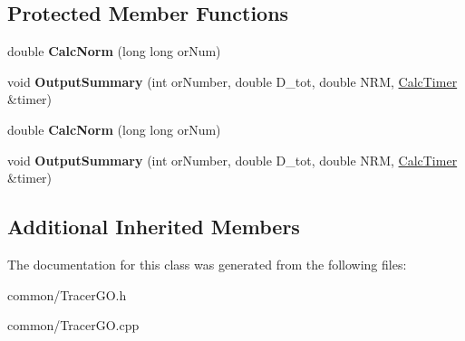 \subsection*{Protected Member Functions}
\begin{DoxyCompactItemize}
\item 
\mbox{\label{class_tracer_g_o_a61ff6ee937f176142c83b4273dfc8545}} 
double {\bfseries Calc\+Norm} (long long or\+Num)
\item 
\mbox{\label{class_tracer_g_o_a716aa00f03bcfc581ce47f8cca60259f}} 
void {\bfseries Output\+Summary} (int or\+Number, double D\+\_\+tot, double N\+RM, \mbox{\hyperlink{class_calc_timer}{Calc\+Timer}} \&timer)
\item 
\mbox{\label{class_tracer_g_o_a61ff6ee937f176142c83b4273dfc8545}} 
double {\bfseries Calc\+Norm} (long long or\+Num)
\item 
\mbox{\label{class_tracer_g_o_a716aa00f03bcfc581ce47f8cca60259f}} 
void {\bfseries Output\+Summary} (int or\+Number, double D\+\_\+tot, double N\+RM, \mbox{\hyperlink{class_calc_timer}{Calc\+Timer}} \&timer)
\end{DoxyCompactItemize}
\subsection*{Additional Inherited Members}


The documentation for this class was generated from the following files\+:\begin{DoxyCompactItemize}
\item 
common/Tracer\+G\+O.\+h\item 
common/Tracer\+G\+O.\+cpp\end{DoxyCompactItemize}
